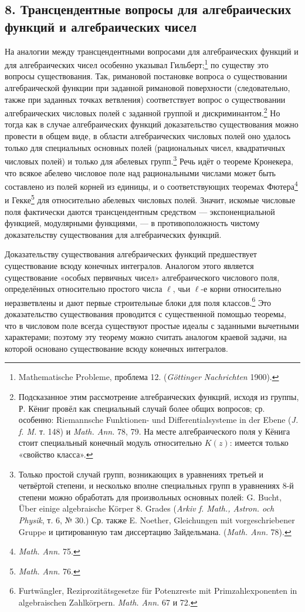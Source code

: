 \documentclass[11pt]{article}
\begin{document}
\subsection*{8. Трансцендентные вопросы для алгебраических функций и алгебраических чисел}
На аналогии между трансцендентными вопросами для алгебраических функций и для алгебраических чисел особенно указывал Гильберт;\footnote{Mathematische Probleme, проблема 12. (\emph{Göttinger Nachrichten} 1900).} по существу это вопросы существования. Так, римановой постановке вопроса о существовании алгебраической функции при заданной римановой поверхности (следовательно, также при заданных точках ветвления) соответствует вопрос о существовании алгебраических числовых полей с заданной группой и дискриминантом.\footnote{Подсказанное этим рассмотрение алгебраических функций, исходя из группы, Р. Кёниг провёл как специальный случай более общих вопросов; ср. особенно: Riemannsche Funktionen- und Differentialsysteme in der Ebene (\emph{J. f. M.} т. 148) и \emph{Math. Ann.} 78, 79. На месте алгебраического поля у Кёнига стоит специальный конечный модуль относительно \(K(z)\): имеется только «свойство класса».} Но тогда как в случае алгебраических функций доказательство существования можно провести в общем виде, в области алгебраических числовых полей оно удалось только для специальных основных полей (рациональных чисел, квадратичных числовых полей) и только для абелевых групп.\footnote{Только простой случай групп, возникающих в уравнениях третьей и четвёртой степени, и несколько вполне специальных групп в уравнениях 8-й степени можно обработать для произвольных основных полей: G. Bucht, Über einige algebraische Körper 8. Grades (\emph{Arkiv f. Math., Astron. och Physik}, т. 6, № 30.) Ср. также E. Noether, Gleichungen mit vorgeschriebener Gruppe и цитированную там диссертацию Зайдельмана. (\emph{Math. Ann.} 78).} Речь идёт о теореме Кронекера, что всякое абелево числовое поле над рациональными числами может быть составлено из полей корней из единицы, и о соответствующих теоремах Фютера\footnote{\emph{Math. Ann.} 75.} и Гекке\footnote{\emph{Math. Ann.} 76.} для относительно абелевых числовых полей. Значит, искомые числовые поля фактически даются трансцендентным средством --- экспоненциальной функцией, модулярными функциями, --- в противоположность чистому доказательству существования для алгебраических функций.

Доказательству существования алгебраических функций предшествует существование всюду конечных интегралов. Аналогом этого является существование «особых первичных чисел» алгебраического числового поля, определённых относительно простого числа \(\ell\), чьи \(\ell\)-е корни относительно неразветвлены и дают первые строительные блоки для поля классов.\footnote{Furtwängler, Reziprozitätsgesetze für Potenzreste mit Primzahlexponenten in algebraischen Zahlkörpern. \emph{Math. Ann.} 67 и 72.} Это доказательство существования проводится с существенной помощью теоремы, что в числовом поле всегда существуют простые идеалы с заданными вычетными характерами; поэтому эту теорему можно считать аналогом краевой задачи, на которой основано существование всюду конечных интегралов.
\end{document}
